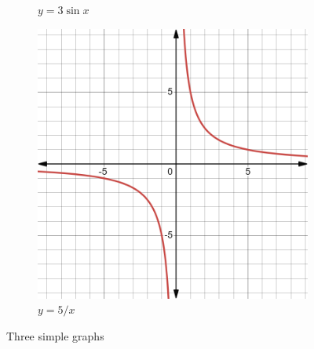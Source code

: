 \documentclass{article}
\begin{document}
\begin{figure}[ht]
\begin{subfigure}[c]{0.3\textwidth}
             \caption{$y=3 \sin x$}
	\end{subfigure}
 \hfill
      \begin{subfigure}[c]{0.3\textwidth}
	   \centering
	   \includegraphics[width=1\textwidth]{y=5byx.png}
         \caption{$y=5/x$}
	\end{subfigure}

\caption{Three simple graphs}
\end{figure}
\end{document}
